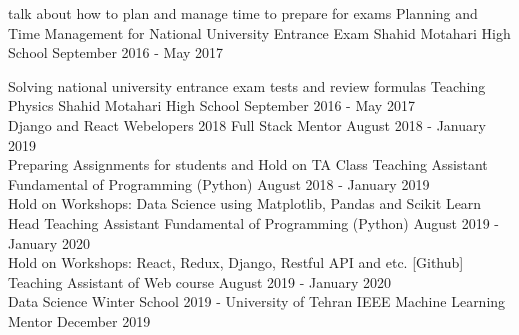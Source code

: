\begin{cventries}
	  \cventry
	{talk about how to plan and manage time to prepare for exams}
	{Planning and Time Management for National University Entrance Exam}
	{Shahid Motahari High School}
	{September 2016 - May 2017}
	{}

	\cventry
{Solving national university entrance exam tests and review formulas}
{Teaching Physics}
{Shahid Motahari High School}
{September 2016 - May 2017}
{}\\

\cventry
{Django and React}
{Webelopers 2018 Full Stack Mentor}
{August 2018 - January 2019}
{}\\

\cventry
{Preparing Assignments for students and Hold on TA Class}
{Teaching Assistant Fundamental of Programming (Python) }
{August 2018 - January 2019}
{}	\\

\cventry
{Hold on Workshops: Data Science using Matplotlib, Pandas and Scikit Learn}
{Head Teaching Assistant Fundamental of Programming (Python)}
{August 2019 - January 2020}
{}
\\
\cventry
{Hold on Workshops: React, Redux, Django, Restful API and etc. [Github]}
{Teaching Assistant of Web course}
{August 2019 - January 2020}
{}
\\

\cventry
{Data Science Winter School 2019 - University of Tehran}
{IEEE Machine Learning Mentor}
{December 2019}
{}
\\	
	

	
	

\end{cventries}
